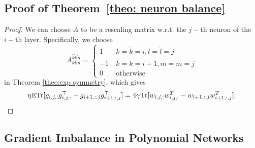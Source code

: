 \documentclass{article}
\theoremstyle{plain}
\newcommand{\Tr}{{\rm Tr}}
\begin{document}
\subsection{Proof of Theorem~\ref{theo: neuron balance}}
\begin{proof}
We can choose $A$ to be a rescaling matrix w.r.t. the $j-$th neuron of the $i-$th layer. Specifically, we choose     \begin{equation}
        A_{klm}^{\tilde{k}\tilde{l}\tilde{m}}=\begin{cases}
1 & \ k=\tilde{k}=i,l=\tilde{l}=j \\
-1 & \ k=\tilde{k}=i+1,m=\tilde{m}=j\\
0&\ \text{otherwise}
\end{cases}
    \end{equation} in Theorem \ref{theo:exp symmetry}, which gives
\begin{equation}
\eta\mathbb{E}\Tr[g_{i,j,:}g_{i,j,:}^\top-g_{i+1,:, j}g_{i+1,:,j}^\top]=4\gamma\Tr[w_{i,j,:}w_{i,j,:}^T-w_{i+1,:,j}w_{i+1,:,j}^T].
\end{equation}
\end{proof}

\subsection{Gradient Imbalance in Polynomial Networks}\label{app sec: polynomial net}
\end{document}
